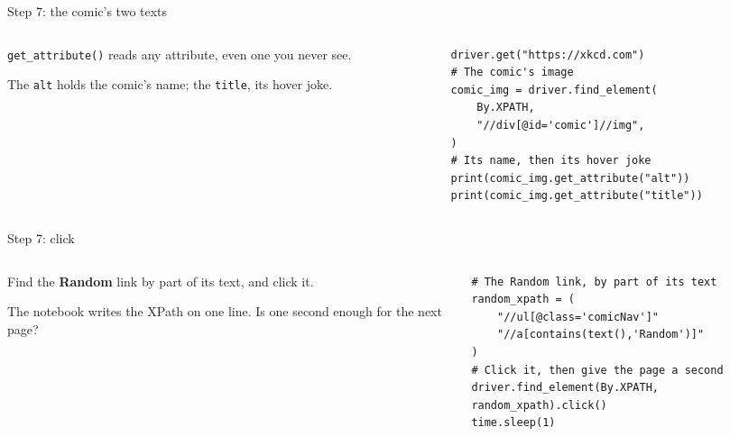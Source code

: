 \documentclass[9pt,aspectratio=169]{beamer}
\begin{document}
\begin{frame}[fragile]{Step 7: the comic's two texts}
    \begin{columns}[T]
        \begin{column}{0.37\textwidth}
            \texttt{get\_attribute()} reads any attribute, even one you never see.

            \medskip
            The \texttt{alt} holds the comic's name; the \texttt{title}, its hover joke.
        \end{column}
        \begin{column}{0.6\textwidth}
\begin{lstlisting}[style=lab]
driver.get("https://xkcd.com")
# The comic's image
comic_img = driver.find_element(
    By.XPATH,
    "//div[@id='comic']//img",
)
# Its name, then its hover joke
print(comic_img.get_attribute("alt"))
print(comic_img.get_attribute("title"))
\end{lstlisting}
        \end{column}
    \end{columns}
\end{frame}

\begin{frame}[fragile]{Step 7: click}
    \begin{columns}[T]
        \begin{column}{0.37\textwidth}
            Find the \textbf{Random} link by part of its text, and click it.

            \medskip
            The notebook writes the XPath on one line. Is one second enough for the next page?
        \end{column}
        \begin{column}{0.6\textwidth}
\begin{lstlisting}[style=lab]
# The Random link, by part of its text
random_xpath = (
    "//ul[@class='comicNav']"
    "//a[contains(text(),'Random')]"
)
# Click it, then give the page a second
driver.find_element(By.XPATH, random_xpath).click()
time.sleep(1)
\end{lstlisting}
        \end{column}
    \end{columns}
\end{frame}
\end{document}
